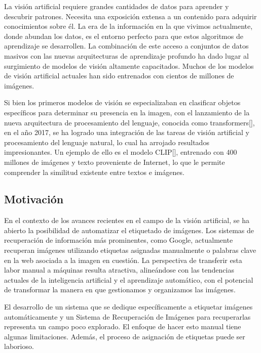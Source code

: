 La visi\'on artificial requiere grandes cantidades de datos para aprender y descubrir patrones. Necesita una exposici\'on extensa a un contenido para adquirir conocimientos sobre \'el. La era de la informaci\'on en la que vivimos actualmente, donde abundan los datos, es el entorno perfecto para que estos algoritmos de aprendizaje se desarrollen. La combinaci\'on de este acceso a conjuntos de datos masivos con las nuevas arquitecturas de aprendizaje profundo ha dado lugar al surgimiento de modelos de visi\'on altamente capacitados. Muchos de los modelos de visi\'on artificial actuales han sido entrenados con cientos de millones de im\'agenes.

Si bien los primeros modelos de visi\'on se especializaban en clasificar objetos espec\'ificos para determinar su presencia en la imagen, con el lanzamiento de la nueva arquitectura de procesamiento del lenguaje, conocida como transformers[\cite{transformers}], en el a\~no 2017, se ha logrado una integraci\'on de las tareas de visi\'on artificial y procesamiento del lenguaje natural, lo cual ha arrojado resultados impresionantes. Un ejemplo de ello es el modelo CLIP[\cite{clip}], entrenado con 400 millones de im\'agenes y texto proveniente de Internet, lo que le permite comprender la similitud existente entre textos e im\'agenes.

\subsection*{Motivaci\'on}
En el contexto de los avances recientes en el campo de la visi\'on artificial, se ha abierto la posibilidad de automatizar el etiquetado de im\'agenes. Los sistemas de recuperaci\'on de informaci\'on m\'as prominentes, como Google, actualmente recuperan im\'agenes utilizando etiquetas asignadas manualmente o palabras clave en la web asociada a la imagen en cuesti\'on. La perspectiva de transferir esta labor manual a m\'aquinas resulta atractiva, aline\'andose con las tendencias actuales de la inteligencia artificial y el aprendizaje autom\'atico, con el potencial de transformar la manera en que gestionamos y organizamos las im\'agenes.

El desarrollo de un sistema que se dedique espec\'ificamente a etiquetar im\'agenes autom\'aticamente y un Sistema de Recuperaci\'on de Im\'agenes para recuperarlas representa un campo poco explorado. El enfoque de hacer esto manual tiene algunas limitaciones. Adem\'as, el proceso de asignaci\'on de etiquetas puede ser laborioso.

